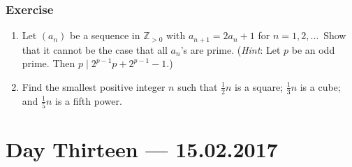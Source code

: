 \documentclass{amsbook}
\theoremstyle{plain}
\theoremstyle{definition}
\theoremstyle{remark}
\numberwithin{equation}{chapter}
\numberwithin{figure}{chapter}
\newcommand{\Z}{\mathbb{Z}}
\begin{document}
\subsection*{Exercise}
\begin{enumerate}
\item Let $(a_n)$ be a sequence in $\Z_{>0}$ with $a_{n + 1} = 2 a_n + 1$ for $n = 1, 2, \ldots\, $ Show that it cannot be the case that all $a_n$'s are prime. (\emph{Hint}: Let $p$ be an odd prime. Then $p \mid 2^{p-1} p + 2^{p-1} - 1$.)
\item Find the smallest positive integer $n$ such that $\frac{1}2 n$ is a square; $\frac{1}3 n$ is a cube; and $\frac{1}5 n$ is a fifth power. 
\end{enumerate}

\chapter[Lecture Thirteen]{Day Thirteen \hfill {\footnotesize \rm --- 15.02.2017}}\label{chp:euler_thm}
\end{document}
